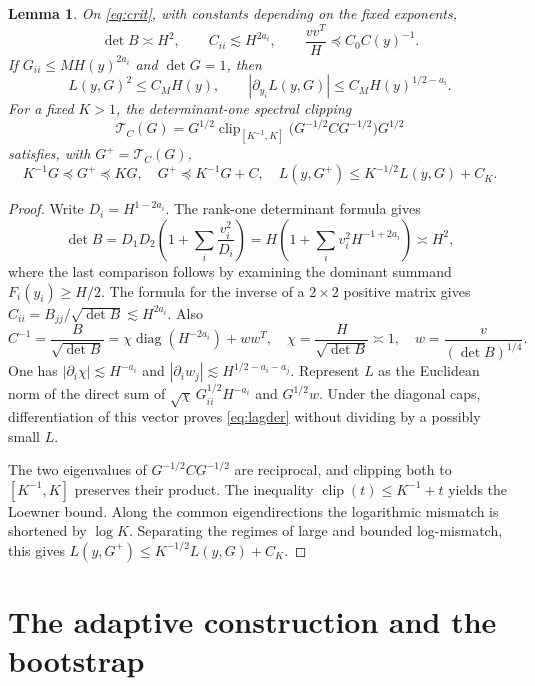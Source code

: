 \documentclass[11pt]{article}
\newtheorem{lemma}[lemma]{Lemma}
\theoremstyle{definition}
\theoremstyle{remark}
\numberwithin{equation}{section}
\begin{document}
\begin{lemma}\label{lem:selector}
On \eqref{eq:crit}, with constants depending on the fixed exponents,
\begin{equation}\label{eq:selectors}
 \det B\asymp H^2,\qquad C_{ii}\lesssim H^{2a_i},\qquad
 \frac{vv^T}{H}\preceq C_0C(y)^{-1}.
\end{equation}
If $G_{ii}\le M H(y)^{2a_i}$ and $\det G=1$, then
\begin{equation}\label{eq:lagder}
 L(y,G)^2\le C_M H(y),\qquad
 |\partial_{y_i}L(y,G)|\le C_M H(y)^{1/2-a_i}.
\end{equation}
For a fixed $K>1$, the determinant-one spectral clipping
\[
 \mathcal T_C(G)=G^{1/2}
  \operatorname{clip}_{[K^{-1},K]}\bigl(G^{-1/2}CG^{-1/2}\bigr)G^{1/2}
\]
satisfies, with $G^+=\mathcal T_C(G)$,
\begin{equation}\label{eq:clipping}
 K^{-1}G\preceq G^+\preceq KG,\quad
 G^+\preceq K^{-1}G+C,\quad
 L(y,G^+)\le K^{-1/2}L(y,G)+C_K.
\end{equation}
\end{lemma}
\begin{proof}
Write $D_i=H^{1-2a_i}$. The rank-one determinant formula gives
\[
 \det B=D_1D_2\left(1+\sum_i\frac{v_i^2}{D_i}\right)
 =H\left(1+\sum_i v_i^2H^{-1+2a_i}\right)\asymp H^2,
\]
where the last comparison follows by examining the dominant summand
$F_i(y_i)\ge H/2$. The formula for the inverse of a $2\times2$
positive matrix gives $C_{ii}=B_{jj}/\sqrt{\det B}\lesssim H^{2a_i}$.
Also
\[
 C^{-1}=\frac{B}{\sqrt{\det B}}
 =\chi\operatorname{diag}(H^{-2a_i})+ww^T,
 \quad \chi=\frac H{\sqrt{\det B}}\asymp1,
 \quad w=\frac v{(\det B)^{1/4}}.
\]
One has $|\partial_i\chi|\lesssim H^{-a_i}$ and
$|\partial_i w_j|\lesssim H^{1/2-a_i-a_j}$.
Represent $L$ as the Euclidean norm of the direct sum of
$\sqrt\chi\,G_{ii}^{1/2}H^{-a_i}$ and $G^{1/2}w$.
Under the diagonal caps, differentiation of this vector proves
\eqref{eq:lagder} without dividing by a possibly small $L$.

The two eigenvalues of $G^{-1/2}CG^{-1/2}$ are reciprocal, and
clipping both to $[K^{-1},K]$ preserves their
product. The inequality $\operatorname{clip}(t)\le K^{-1}+t$ yields the
Loewner bound. Along the common eigendirections the logarithmic
mismatch is shortened by $\log K$. Separating the regimes of large and
bounded log-mismatch, this gives
$L(y,G^+)\le K^{-1/2}L(y,G)+C_K$.
\end{proof}

\section{The adaptive construction and the bootstrap}\label{sec:bootstrap}
\end{document}
